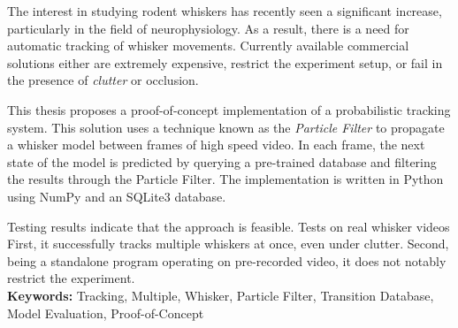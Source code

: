 The interest in studying rodent whiskers has recently seen a significant increase, 
particularly in the field of neurophysiology. As a result, there is a need for automatic 
tracking of whisker movements. Currently available commercial solutions either are 
extremely expensive, restrict the experiment setup, or fail in the presence of 
\emph{clutter} or occlusion. 

This thesis proposes a proof-of-concept implementation of a probabilistic tracking system. 
This solution uses a technique known as the \emph{Particle Filter} to propagate a whisker model between frames of high speed video. 
In each frame, the next state of the model is predicted by querying a pre-trained database and filtering the results 
through the Particle Filter. The implementation is written in Python using NumPy and an SQLite3 database.

Testing results indicate that the approach is feasible. Tests on real whisker
videos 
First, it successfully tracks multiple whiskers at once, even under clutter. 
Second, being a standalone program operating on pre-recorded video, it does not notably restrict the experiment.\\

\textbf{Keywords:} Tracking, Multiple, Whisker, Particle Filter, Transition Database, Model Evaluation, Proof-of-Concept
